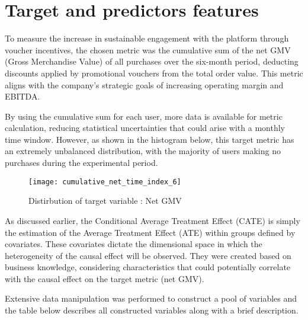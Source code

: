 \section{Target and predictors features}
\label{sub:target_feature}

To measure the increase in sustainable engagement with the platform through voucher incentives, the chosen metric was the cumulative sum of the net GMV (Gross Merchandise Value) of all purchases over the six-month period,
deducting discounts applied by promotional vouchers from the total order value. This metric aligns with the company’s strategic goals of increasing operating margin and EBITDA.

By using the cumulative sum for each user, more data is available for metric calculation, reducing statistical uncertainties that could arise with a monthly time window. However, as shown in the histogram below, this
target metric has an extremely unbalanced distribution, with the majority of users making no purchases during the experimental period.

\begin{figure}[htbp]
  \centering
  \texttt{[image: cumulative\_net\_time\_index\_6]}
  \caption{Distirbution of target variable : Net GMV}
  \label{fig:histogram_net_gmv}
\end{figure}

As discussed earlier, the Conditional Average Treatment Effect (\gls{CATE}) is simply the estimation of the Average Treatment Effect (\gls{ATE}) within groups defined by covariates. These covariates dictate the dimensional space 
in which the heterogeneity of the causal effect will be observed. They were created based on business knowledge, considering characteristics that could potentially correlate with the causal effect on the target metric (net GMV).

Extensive data manipulation was performed to construct a pool of variables and the table below describes all constructed variables along with a brief description.


